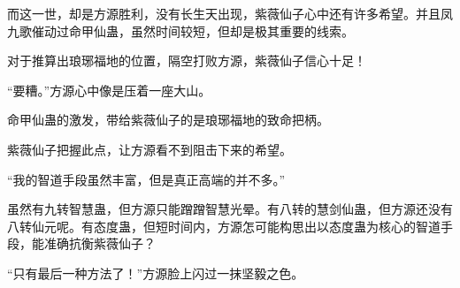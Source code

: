 \begin{this_body}
而这一世，却是方源胜利，没有长生天出现，紫薇仙子心中还有许多希望。并且凤九歌催动过命甲仙蛊，虽然时间较短，但却是极其重要的线索。

对于推算出琅琊福地的位置，隔空打败方源，紫薇仙子信心十足！

“要糟。”方源心中像是压着一座大山。

命甲仙蛊的激发，带给紫薇仙子的是琅琊福地的致命把柄。

紫薇仙子把握此点，让方源看不到阻击下来的希望。

“我的智道手段虽然丰富，但是真正高端的并不多。”

虽然有九转智慧蛊，但方源只能蹭蹭智慧光晕。有八转的慧剑仙蛊，但方源还没有八转仙元呢。有态度蛊，但短时间内，方源怎可能构思出以态度蛊为核心的智道手段，能准确抗衡紫薇仙子？

“只有最后一种方法了！”方源脸上闪过一抹坚毅之色。

\end{this_body}


